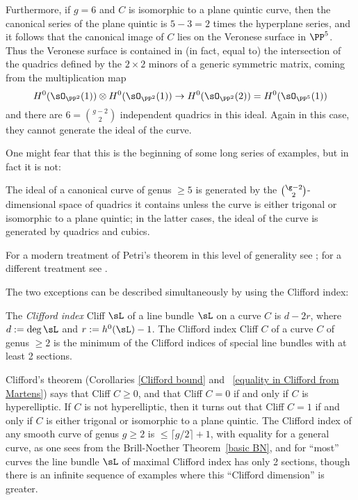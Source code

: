 Furthermore, if $g = 6$ and $C$ is isomorphic to a plane quintic curve, then the canonical series of the plane quintic is $5-3 = 2$ times the hyperplane series, and it follows that the canonical image of $C$ lies on the Veronese surface in $\PP^{5}$. Thus the Veronese surface is contained in (in fact, equal to) the intersection of the quadrics defined by the $2\times 2$ minors of a generic symmetric matrix, coming from the 
multiplication map 
$$
H^{0}(\sO_{\PP^{2}}(1))\otimes H^{0}(\sO_{\PP^{2}}(1)) \to H^{0}(\sO_{\PP^{2}}(2)) = H^{0}(\sO_{\PP^{5}}(1))
$$
and there are $6 = {g-2\choose 2}$ independent quadrics in this ideal. Again in this case, they cannot generate the ideal of the curve.

One might fear that this is the beginning of some long series of examples, but in fact it is not: 

\begin{theorem} [Petri]
The ideal of a canonical curve of genus $\geq 5$ is generated by the $\g-2\choose 2$-dimensional space of quadrics it contains unless the curve is either trigonal or isomorphic to a plane quintic; in the latter cases, the ideal of the curve is generated by quadrics and cubics.
\end{theorem}

For a modern treatment of Petri's theorem in this level of generality see \cite{Schreyer}; for a different treatment see \cite{Arbarello-Sernesi}.

The two exceptions can be described simultaneously by using the Clifford index:

\begin{definition}
 The \emph{Clifford index} Cliff $\sL$ of a line bundle $\sL$ on a curve $C$ is $d-2r$, where $d := \deg \sL$ and $r :=  h^0(\sL)-1$. The Clifford index Cliff $C$ of
 a curve $C$ of genus $\geq 2$ is the minimum of the Clifford indices of special line bundles with at least 2 sections.
\end{definition}

Clifford's theorem (Corollaries \ref{Clifford bound} and ~\ref{equality in Clifford from Martens}) says that Cliff $C \geq 0$, and that Cliff $C = 0$ if and only if $C$ is hyperelliptic. If $C$ is not hyperelliptic, then it turns out that Cliff $C=1$ if and only if $C$ is either trigonal or isomorphic to a plane quintic. The Clifford index of any smooth curve of genus $g\geq 2$ is $\leq \lceil g/2\rceil+1$, with equality for a general curve, as one sees from the Brill-Noether Theorem~\ref{basic BN}, and for ``most'' curves the line bundle $\sL$ of maximal Clifford index has only 2 sections, though there is an infinite sequence of examples where this
``Clifford dimension'' is greater.

